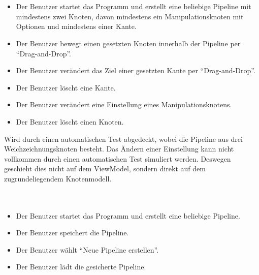 \paragraph{}

\paragraph{} ~\\

\begin{itemize}
	\item Der Benutzer startet das Programm und erstellt eine beliebige Pipeline mit mindestens zwei Knoten, davon mindestens ein Manipulationsknoten mit Optionen und mindestens einer Kante.
			\item Der Benutzer bewegt einen gesetzten Knoten innerhalb der Pipeline per ``Drag-and-Drop''.
			\item Der Benutzer verändert das Ziel einer gesetzten Kante per ``Drag-and-Drop''.
			\item Der Benutzer löscht eine Kante.
			\item Der Benutzer verändert eine Einstellung eines Manipulationsknotens.
			\item Der Benutzer löscht einen Knoten.
\end{itemize}

Wird durch einen automatischen Test abgedeckt, wobei die Pipeline aus drei Weichzeichnungsknoten besteht. Das Ändern einer Einstellung kann nicht vollkommen durch einen automatischen Test simuliert werden. Deswegen geschieht dies nicht auf dem ViewModel, sondern direkt auf dem zugrundeliegendem Knotenmodell.

\paragraph{} ~\\

\begin{itemize}
	\item Der Benutzer startet das Programm und erstellt eine beliebige Pipeline.
	\item Der Benutzer speichert die Pipeline.
	\item Der Benutzer wählt ``Neue Pipeline erstellen''.
	\item Der Benutzer lädt die gesicherte Pipeline.
\end{itemize}

